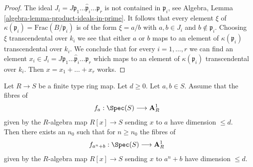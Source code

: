 \begin{proof}
The ideal
$J_i = J \mathfrak p_1 \ldots \hat{\mathfrak p}_i \ldots \mathfrak p_r$ is not
contained in $\mathfrak p_i$, see
Algebra, Lemma \ref{algebra-lemma-product-ideals-in-prime}.
It follows that every element $\xi$ of
$\kappa(\mathfrak p_i) = \text{Frac}(B/\mathfrak p_i)$
is of the form $\xi = a/b$ with $a, b \in J_i$
and $b \not \in \mathfrak p_i$. Choosing $\xi$ transcendental
over $k_i$ we see that either $a$ or $b$ maps to an element
of $\kappa(\mathfrak p_i)$ transcendental over $k_i$.
We conclude that for every $i = 1, \ldots, r$
we can find an element
$x_i \in J_i = J \mathfrak p_1 \ldots \hat{\mathfrak p}_i \ldots \mathfrak p_r$
which maps to an element of $\kappa(\mathfrak p_i)$
transcendental over $k_i$. Then $x = x_1 + \ldots + x_r$ works.
\end{proof}

\begin{lemma}
\label{lemma-sum-is-ok}
Let $R \to S$ be a finite type ring map. Let $d \geq 0$. Let $a, b \in S$.
Assume that the fibres of
$$
f_a : \Spec(S) \longrightarrow \mathbf{A}^1_R
$$
given by the $R$-algebra map $R[x] \to S$ sending $x$ to $a$
have dimension $\leq d$. Then there exists an $n_0$ such that for
$n \geq n_0$ the fibres of
$$
f_{a^n + b} : \Spec(S) \longrightarrow \mathbf{A}^1_R
$$
given by the $R$-algebra map $R[x] \to S$ sending $x$ to $a^n + b$
have dimension $\leq d$.
\end{lemma}

